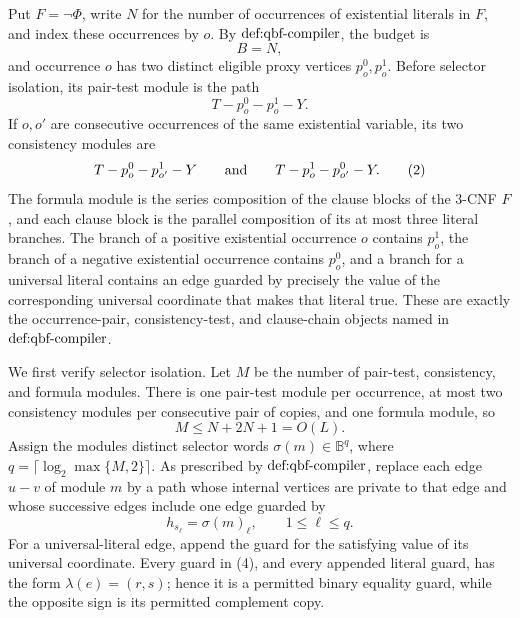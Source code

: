 Put \(F=\neg\Phi\), write \(N\) for the number of occurrences of existential literals in \(F\), and index these occurrences by \(o\).  By \(\textnormal{def:qbf-compiler}\), the budget is
\[
B=N,
\]
and occurrence \(o\) has two distinct eligible proxy vertices \(p_o^0,p_o^1\).  Before selector isolation, its pair-test module is the path
\[
T-p_o^0-p_o^1-Y. \tag{1}
\]
If \(o,o'\) are consecutive occurrences of the same existential variable, its two consistency modules are
\[
T-p_o^0-p_{o'}^1-Y
\qquad\hbox{and}\qquad
T-p_o^1-p_{o'}^0-Y. \tag{2}
\]
The formula module is the series composition of the clause blocks of the \(3\)-CNF \(F\), and each clause block is the parallel composition of its at most three literal branches.  The branch of a positive existential occurrence \(o\) contains \(p_o^1\), the branch of a negative existential occurrence contains \(p_o^0\), and a branch for a universal literal contains an edge guarded by precisely the value of the corresponding universal coordinate that makes that literal true.  These are exactly the occurrence-pair, consistency-test, and clause-chain objects named in \(\textnormal{def:qbf-compiler}\).

We first verify selector isolation.  Let \(M\) be the number of pair-test, consistency, and formula modules.  There is one pair-test module per occurrence, at most two consistency modules per consecutive pair of copies, and one formula module, so
\[
M\le N+2N+1=O(L). \tag{3}
\]
Assign the modules distinct selector words \(\sigma(m)\in\mathbb B^q\), where \(q=\lceil\log_2\max\{M,2\}\rceil\).  As prescribed by \(\textnormal{def:qbf-compiler}\), replace each edge \(u-v\) of module \(m\) by a path whose internal vertices are private to that edge and whose successive edges include one edge guarded by
\[
h_{s_\ell}=\sigma(m)_\ell,
\qquad 1\le \ell\le q. \tag{4}
\]
For a universal-literal edge, append the guard for the satisfying value of its universal coordinate.  Every guard in (4), and every appended literal guard, has the form \(\lambda(e)=(r,s)\); hence it is a permitted binary equality guard, while the opposite sign is its permitted complement copy.

